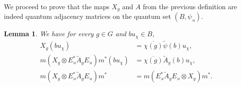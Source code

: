 \documentclass{amsart}
\newtheorem{lemma}[thm]{Lemma}
\theoremstyle{definition}
\theoremstyle{definition}
\begin{document}
We proceed to prove that the maps $X_g$ and $A$ from the previous definition are indeed quantum adjacency matrices on the quantum set $(B, \psi_\rtimes)$.

\begin{lemma}
    \label{der::lemma:commutation_in_derived_graph}
    We have for every $g \in G$ and $b u_\chi \in B$,
    \begin{align}
        \label{der::eq:formula_for_X_g}
        X_g(b u_\chi) &= \overline{\chi(g)} \tilde{\psi}(b) u_\chi, \\
        \label{der::eq:formula_for_m(X_g_otimes_EstarAE)mstar}
        m(X_g \otimes E_\rtimes^\ast \tilde{A}_g E_\rtimes) m^\ast(b u_\chi) &= \overline{\chi(g)} \tilde{A}_g(b) u_\chi, \\
        \label{der::eq:commutation_in_derived_graph}
        m(X_g \otimes E_\rtimes^\ast \tilde{A}_g E_\rtimes) m^\ast &= m(E_\rtimes^\ast \tilde{A}_g E_\rtimes \otimes X_g) m^\ast.
    \end{align}
\end{lemma}
\end{document}
